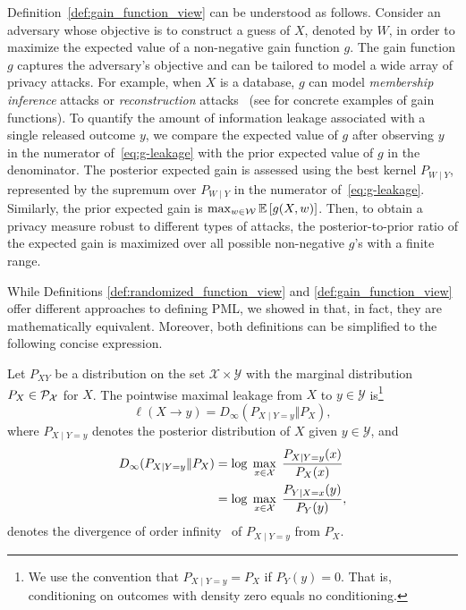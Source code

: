 Definition~\ref{def:gain_function_view} can be understood as follows. Consider an adversary whose objective is to construct a guess of $X$, denoted by $W$, in order to maximize the expected value of a non-negative gain function $g$. The gain function $g$ captures the adversary's objective and can be tailored to model a wide array of privacy attacks. For example, when $X$ is a database, $g$ can model \emph{membership inference} attacks or \emph{reconstruction} attacks~\cite{dwork2017exposed} (see \cite{saeidian2023pointwise_it} for concrete examples of gain functions). To quantify the amount of information leakage associated with a single released outcome $y$, we compare the expected value of $g$ after observing $y$ in the numerator of~\eqref{eq:g-leakage} with the prior expected value of $g$ in the denominator. The posterior expected gain is assessed using the best kernel $P_{W \mid Y}$, represented by the supremum over $P_{W \mid Y}$ in the numerator of~\eqref{eq:g-leakage}. Similarly, the prior expected gain is $\max_{w \in \mathcal{W}} \mathbb{E}\left[g(X, w)\right]$. Then, to obtain a privacy measure robust to different types of attacks, the posterior-to-prior ratio of the expected gain is maximized over all possible non-negative $g$'s with a finite range. 

While Definitions \ref{def:randomized_function_view} and \ref{def:gain_function_view} offer different approaches to defining PML, we showed in \cite[Thm. 2]{saeidian2023pointwise_it} that, in fact, they are mathematically equivalent. Moreover, both definitions can be simplified to the following concise expression.
\begin{theorem}
\label{thm:pml}
Let $P_{XY}$ be a distribution on the set $\mathcal X \times \mathcal Y$ with the marginal distribution $P_X \in \mathcal{P}_{\mathcal{X}}$ for $X$. The pointwise maximal leakage from $X$ to $y \in \mathcal Y$ is\footnote{We use the convention that $P_{X \mid Y=y} = P_X$ if $P_Y(y) =0$. That is, conditioning on outcomes with density zero equals no conditioning.}
\begin{equation}
\label{eq:pml_simple}
    \ell(X \to y) = D_\infty(P_{X \mid Y=y} \Vert P_X),
\end{equation}
where $P_{X \mid Y=y}$ denotes the posterior distribution of $X$ given $y \in \mathcal Y$, and
\begin{align*}
    D_\infty(P_{X \mid Y=y} \Vert P_X) &= \log \; \max_{x \in \mathcal{X}} \; \frac{P_{X \mid Y=y}(x)}{P_X(x)}\\
    &= \log \; \max_{x \in \mathcal{X}} \; \frac{P_{Y \mid X=x}(y)}{P_Y(y)},
\end{align*}
denotes the \Ren divergence of order infinity~\cite{renyi1961measures} of $P_{X \mid Y=y}$ from $P_X$.  
\end{theorem}


